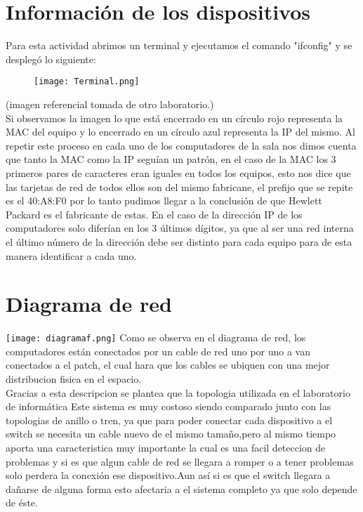 \documentclass{udpreport}
\begin{document}
	\section{Información de los dispositivos}
		Para esta actividad abrimos un terminal y ejecutamos el comando "ifconfig" y se desplegó lo siguiente:\\
		\begin{figure}[h]
    		\centering
    	\texttt{[image: Terminal.png]}
		\end{figure}
		(imagen referencial tomada de otro laboratorio.)\\
		Si observamos la imagen lo que está encerrado en un círculo rojo representa la MAC del equipo y lo encerrado en un
		círculo azul representa la IP del mismo. Al repetir este proceso en cada uno de los computadores de la sala nos    
		dimos cuenta que tanto la MAC como la IP seguían un patrón, en el caso de la MAC los 3 primeros pares de caracteres
		eran iguales en todos los equipos, esto nos dice que las tarjetas de red de todos ellos son del mismo fabricane,      
		el prefijo que se repite es el 40:A8:F0 por lo tanto pudimos llegar a la conclusión de que Hewlett Packard es el      
		fabricante de estas. En el caso de la dirección IP de los computadores solo diferían en los 3 últimos dígitos, ya     
		que al ser una red interna el último número de la dirección debe ser distinto para cada equipo para de esta manera    
		identificar a cada uno.
	\section{Diagrama de red}
		\texttt{[image: diagramaf.png]}
		Como se observa en el diagrama de red, los computadores están conectados por un cable de red uno por uno 
		a van conectados a el patch, el cual hara que los cables se ubiquen con una mejor distribucion fisica 
		en el espacio.\\
		Gracias a esta descripcion se plantea que la topologia utilizada en el laboratorio de informática
		Este sistema es muy costoso siendo comparado junto con las topologias de anillo o tren, ya que para poder
		conectar cada dispositivo a el switch se necesita un cable nuevo de el mismo tamaño,pero al mismo tiempo
		aporta una caracteristica muy importante la cual es una facil deteccion de problemas y si es que algun
		cable de red se llegara a romper o a tener problemas solo perdera la conexión  ese dispositivo.Aun así 
		si es que el switch llegara a dañarse de alguna forma esto afectaria a el sistema completo ya que solo
		depende de éste.
\end{document}
